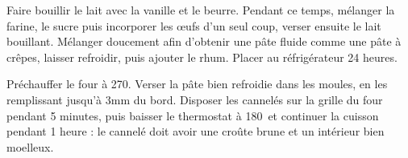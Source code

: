 \begin{nouvellerecette}


Faire bouillir le lait avec la vanille et le beurre.
Pendant ce temps, mélanger la farine, le sucre puis incorporer les œufs d'un seul coup, verser
ensuite le lait bouillant.
Mélanger doucement afin d'obtenir une pâte fluide comme une pâte à crêpes, laisser refroidir, puis
ajouter le rhum. Placer au réfrigérateur 24 heures.

Préchauffer le four à 270\degrees.
Verser la pâte bien refroidie dans les moules, en les remplissant jusqu'à 3mm du bord. Disposer les
cannelés sur la grille du four pendant 5 minutes, puis baisser le thermostat à 180\degrees\ et
continuer la cuisson pendant 1 heure : le cannelé doit avoir une croûte brune et un intérieur bien
moelleux.


\end{nouvellerecette}
